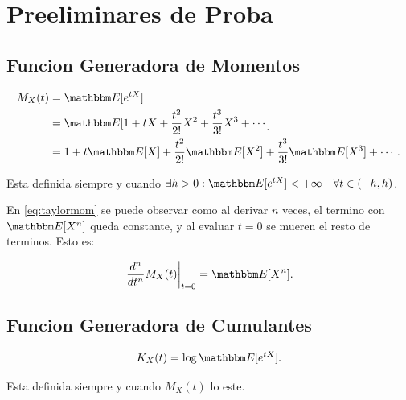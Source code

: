 \section{Preeliminares de Proba}

\subsection{Funcion Generadora de Momentos}

\begin{definition} \label{def:fgm}

\begin{align}
    M_X(t)&=\E{e^{tX}} \\
          &=\E{1 + tX + \frac{t^2}{2!}X^2 + \frac{t^3}{3!}X^3 + \cdots} \nonumber \\
          &= 1 + t\E{X} + \frac{t^2}{2!}\E{X^2} +  \frac{t^3}{3!}\E{X^3} + \cdots. \label{eq:taylormom}
\end{align}

Esta definida siempre y cuando \(\exists h>0 : \E{e^{tX}}<+\infty \quad \forall t \in (-h,h)\).

\end{definition}

\begin{property}\label{obs:genmomentos}
En \eqref{eq:taylormom} se puede observar como al derivar \(n\) veces, el termino con \(\E{X^n}\) queda constante, y al evaluar \(t=0\) se mueren el resto de terminos. Esto es:

    \begin{equation}
       \left. \dfrac{d^n}{dt^n} M_X(t) \right|_{t=0}  = \E{X^n}.
    \end{equation}

\end{property}

\subsection{Funcion Generadora de Cumulantes}

\begin{definition} \label{def:cgf}

\begin{equation} \label{eq:gencumulantes}
    K_X(t) = \log\E{e^{tX}}.
\end{equation}

Esta definida siempre y cuando \(M_X(t)\) lo este.
\end{definition}

